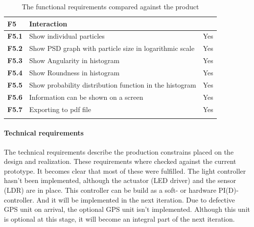 \documentclass[11pt,fleqn,,a4paper,twoside,openright]{book}
\begin{document}
\begin{longtable}{|p{1cm}| p{9cm} p{2.5cm}|}
	\hline
	\textbf{F5}\label{F5} & \textbf{Interaction} &  \\
	\hline
	\textbf{F5.1}\label{F5.1} & Show individual particles  & Yes \\
	\hline
	\textbf{F5.2}\label{F5.2} & Show PSD graph with particle size in logarithmic scale  & Yes  \\
	\hline
	\textbf{F5.3}\label{F5.3} & Show Angularity in histogram  & Yes \\
	\hline
	\textbf{F5.4}\label{F5.4} & Show Roundness in histogram & Yes \\
	\hline
	\textbf{F5.5}\label{F5.5} & Show probability distribution function in the histogram & Yes \\
	\hline
	\textbf{F5.6}\label{F5.6} & Information can be shown on a screen & Yes \\
	\hline
	\textbf{F5.7}\label{F5.7} & Exporting to pdf file & Yes \\
	\hline
	\caption{The functional requirements compared against the product}\label{tab:FuncReqCompaire}
\end{longtable}

\newpage
\paragraph{Technical requirements}
The technical requirements describe the production constrains placed on the design and realization. These requirements where checked against the current prototype. It becomes clear that most of these were fulfilled. The light controller hasn't been implemented, although the actuator (LED driver) and the sensor (LDR) are in place. This controller can be build as a soft- or hardware PI(D)-controller. And it will be implemented in the next iteration.
Due to defective GPS unit on arrival, the optional GPS unit isn't implemented. Although this unit is optional at this stage, it will become an integral part of the next iteration.
\end{document}

